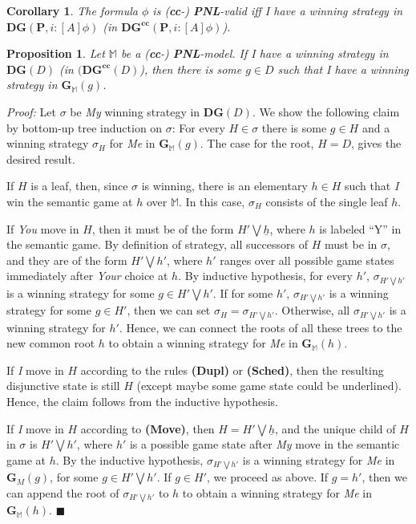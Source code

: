 \documentclass{easychair}
\newcommand{\I}{\emph{I}\xspace}
\newcommand{\You}{\emph{You}\xspace}
\newcommand{\My}{\emph{My}\xspace}
\newcommand{\Me}{\emph{Me}\xspace}
\newcommand{\Your}{\emph{Your}\xspace}
\newcommand{\M}{\mathbb{M}}
\renewcommand{\qed}{\hfill$\blacksquare$}
\newtheorem{proposition}{Proposition}
\newtheorem{corollary}{Corollary}
\renewenvironment{proof}{\noindent\textit{Proof:}\quad}{\qed}
\newcommand{\PNL}{\textbf{PNL}}
\newcommand{\cc}{\textbf{cc}}
\begin{document}
\begin{corollary}
The formula $\phi$ is (\cc-) \PNL-valid iff \I have a winning strategy in $\mathbf{DG}(\mathbf{P},i:[A]\phi)$ (in $\mathbf{DG}^\cc(\mathbf{P},i:[A]\phi)$).
\end{corollary}

\begin{proposition}\label{disjY}
Let $\M$ be a (\cc-) \PNL-model. If \I have a winning strategy in $\mathbf{DG}(D)$ (in $(\mathbf{DG}^\cc(D)$), then there is some $g\in D$ such that \I have a winning strategy in $\mathbf{G}_\M(g)$.
\end{proposition}

\begin{proof}
Let $\sigma$ be \My winning strategy in $\mathbf{DG}(D)$. We show the following claim by bottom-up tree induction on $\sigma$: For every $H\in \sigma$ there is some $g\in H$ and a winning strategy $\sigma_H$ for \Me in $\mathbf{G}_\M(g)$. The case for the root, $H=D$, gives the desired result.

If $H$ is a leaf, then, since $\sigma$ is winning, there is an elementary $h\in H$ such that \I win the semantic game at $h$ over $\M$. In this case, $\sigma_H$ consists of the single leaf $h$.

If \You move in $H$, then it must be of the form $H'\bigvee \underline{h}$,
where $h$ is labeled ``Y'' in the semantic game. By  definition of strategy,
all successors of $H$ must be in $\sigma$, and they are of the form $H'\bigvee
h'$, where $h'$ ranges over all possible game states immediately after \Your
choice at $h$. By inductive hypothesis, for every $h'$,
$\sigma_{H'\bigvee h'}$ is a winning strategy for some $g\in H' \bigvee h'$. If
for some $h'$, $\sigma_{H'\bigvee h'}$ is a winning strategy for some $g\in
H'$, then we can set $\sigma_H=\sigma_{H'\bigvee h'}$. Otherwise, all
$\sigma_{H'\bigvee h'}$ is a winning strategy for $h'$. Hence, we can connect
the roots of all these trees to the new common root $h$ to obtain a winning
strategy for \Me in $\mathbf{G}_\M(h)$.

If \I move in $H$ according to the rules 
\textbf{(Dupl)} or \textbf{(Sched)}, then the resulting disjunctive state is still $H$ (except maybe some game state could be underlined). Hence, the claim follows from the inductive hypothesis.

If \I move in $H$ according to \textbf{(Move)}, then $H=H'\bigvee
\underline{h}$, and the unique child of $H$ in $\sigma$ is $H'\bigvee h'$,
where $h'$ is a possible game state after \My move in the semantic game at $h$.
By the inductive hypothesis, $\sigma_{H'\bigvee h'}$ is a winning strategy for
\Me in $\mathbf{G}_M(g)$, for some $g\in H'\bigvee h'$. If $g\in H'$, we
proceed as above. If $g=h'$, then we can append the root of $\sigma_{H' \bigvee
h'}$ to $h$ to obtain a winning strategy for \Me in $\mathbf{G}_\M(h)$.
\end{proof}
\end{document}
